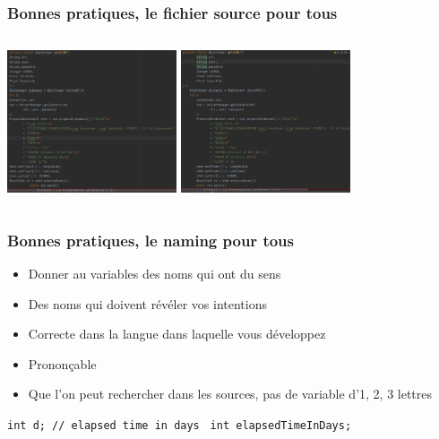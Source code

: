 \documentclass{beamer}
\begin{document}
    \begin{frame}
        \transdissolve
        \frametitle{Bonnes pratiques, le fichier source pour tous}

        \begin{columns}
            \centering
            \includegraphics[width=5cm]{image/numerous-identations.png}
            \centering
            \includegraphics[width=5cm]{image/one-identation.png}
        \end{columns}

    \end{frame}

    \begin{frame}
        \transdissolve
        \frametitle{Bonnes pratiques, le naming pour tous}

        \begin{itemize}

            \item Donner au variables des noms qui ont du sens
            \item Des noms qui doivent révéler vos intentions
            \item Correcte dans la langue dans laquelle vous développez
            \item Prononçable
            \item Que l'on peut rechercher dans les sources, pas de variable d'1, 2, 3 lettres

        \end{itemize}
        \bigbreak

        \quad\texttt{int d; // elapsed time in days }\quad{}
        \bigbreak
        \quad\texttt{int elapsedTimeInDays; }\quad{}
    \end{frame}
\end{document}
